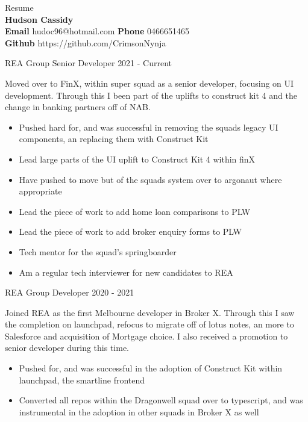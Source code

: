 \documentclass[8pt]{developercv}
\begin{document}
	\begin{minipage}[a]{1.0\textwidth}
		\begin{center}	%
			{\HUGE Resume}\\
			\textbf {Hudson Cassidy} \\
			\textbf {Email} hudoc96@hotmail.com
			\textbf {Phone} 0466651465 \\
			\textbf {Github} https://github.com/CrimsonNynja \\
		\end{center}
	\end{minipage}
	\begin{minipage}[t]{0.7\textwidth}
		\begin{entrylist}	%
			\entry
				{REA Group}
				{Senior Developer}
				{2021 - Current}
				{Moved over to FinX, within super squad as a senior developer, focusing on UI development. Through this I been part of the uplifts to construct kit 4 and the change in banking partners off of NAB.
				\begin{itemize}
					\item Pushed hard for, and was successful in removing the squads legacy UI components, an replacing them with Construct Kit
					\item Lead large parts of the UI uplift to Construct Kit 4 within finX
					\item Have pushed to move but of the squads system over to argonaut where appropriate
					\item Lead the piece of work to add home loan comparisons to PLW
					\item Lead the piece of work to add broker enquiry forms to PLW
					\item Tech mentor for the squad's springboarder
					\item Am a regular tech interviewer for new candidates to REA
				\end{itemize}								
				}
			\entry
				{REA Group}
				{Developer}
				{2020 - 2021}
				{Joined REA as the first Melbourne developer in Broker X. Through this I saw the completion on launchpad, refocus to migrate off of lotus notes, an more to Salesforce and acquisition of Mortgage choice. I also received a promotion to senior developer during this time.
				\begin{itemize}
					\item Pushed for, and was successful in the adoption of Construct Kit within launchpad, the smartline frontend
					\item Converted all repos within the Dragonwell squad over to typescript, and was instrumental in the adoption in other squads in Broker X as well

\end{itemize}}
\end{entrylist}
\end{minipage}
\end{document}
